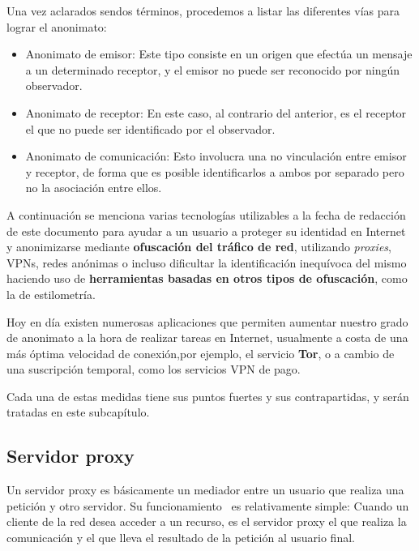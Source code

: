 Una vez aclarados sendos términos, procedemos a listar las diferentes vías para lograr el anonimato:

\begin{itemize}
	\item Anonimato de emisor: Este tipo consiste en un origen que efectúa un mensaje a un determinado receptor, y el emisor no puede ser reconocido por ningún observador.
	\item Anonimato de receptor: En este caso, al contrario del anterior, es el receptor el que no puede ser identificado por el observador.
	\item Anonimato de comunicación: Esto involucra una no vinculación entre emisor y receptor, de forma que es posible identificarlos a ambos por separado pero no la asociación entre ellos.

\end{itemize}
	
\label{sec:a_favor}

A continuación se menciona varias tecnologías utilizables a la fecha de redacción de este documento para ayudar a un usuario a proteger su identidad en Internet y anonimizarse mediante \textbf{ofuscación del tráfico de red}, utilizando \textit{proxies}, VPNs, redes anónimas o incluso dificultar la identificación inequívoca del mismo haciendo uso de \textbf{herramientas basadas en otros tipos de ofuscación}, como la de estilometría.

Hoy en día existen numerosas aplicaciones que permiten aumentar nuestro grado de anonimato a la hora de realizar tareas en Internet, usualmente a costa de una más óptima velocidad de conexión,por ejemplo, el servicio \textbf{Tor}, o a cambio de una suscripción temporal, como los servicios VPN de pago.

Cada una de estas medidas tiene sus puntos fuertes y sus contrapartidas, y serán tratadas en este subcapítulo.

\subsection{Servidor proxy}

Un servidor proxy es básicamente un mediador entre un usuario que realiza una petición y otro servidor.
Su funcionamiento~\cite{article:proxy} es relativamente simple: Cuando un cliente de la red desea acceder a un recurso, es el servidor proxy el que realiza la comunicación y el que lleva el resultado de la petición al usuario final. 

